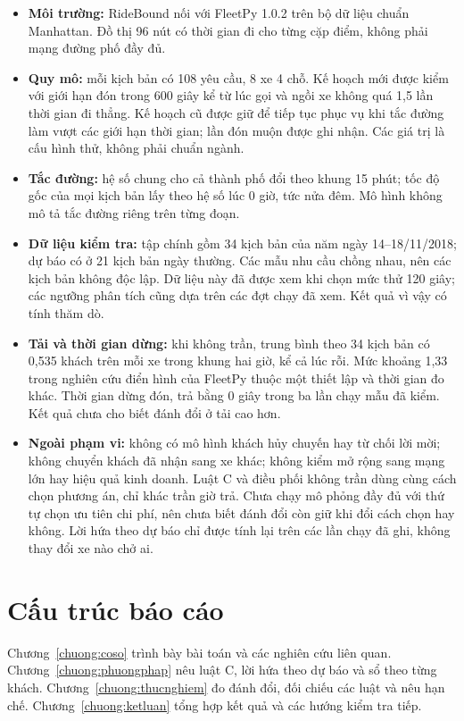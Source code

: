 \begin{itemize}[leftmargin=0.7cm,itemsep=3pt,topsep=3pt]
\item \textbf{Môi trường:} RideBound nối với FleetPy 1.0.2 trên bộ dữ liệu chuẩn Manhattan.
Đồ thị 96 nút có thời gian đi cho từng cặp điểm, không phải mạng đường phố đầy đủ.
\item \textbf{Quy mô:} mỗi kịch bản có 108 yêu cầu, 8 xe 4 chỗ. Kế hoạch mới được kiểm với giới hạn
đón trong 600 giây kể từ lúc gọi và ngồi xe không quá 1,5 lần thời gian đi thẳng. Kế hoạch cũ được
giữ để tiếp tục phục vụ khi tắc đường làm vượt các giới hạn thời gian; lần đón muộn được ghi nhận.
Các giá trị là cấu hình thử, không phải chuẩn ngành.
\item \textbf{Tắc đường:} hệ số chung cho cả thành phố đổi theo khung 15 phút; tốc độ gốc của mọi
kịch bản lấy theo hệ số lúc 0 giờ, tức nửa đêm. Mô hình không mô tả tắc đường riêng trên từng đoạn.
\item \textbf{Dữ liệu kiểm tra:} tập chính gồm 34 kịch bản của năm ngày 14--18/11/2018; dự báo có ở
21 kịch bản ngày thường. Các mẫu nhu cầu chồng nhau, nên các kịch bản không độc lập. Dữ liệu này đã
được xem khi chọn mức thử 120 giây; các ngưỡng phân tích cũng dựa trên các đợt chạy đã xem. Kết quả
vì vậy có tính thăm dò.
\item \textbf{Tải và thời gian dừng:} khi không trần, trung bình theo 34 kịch bản có 0,535 khách
trên mỗi xe trong khung hai giờ, kể cả lúc rỗi. Mức khoảng 1,33 trong nghiên cứu điển hình của
FleetPy thuộc một thiết lập và thời gian đo khác. Thời gian dừng đón, trả bằng 0 giây trong ba
lần chạy mẫu đã kiểm. Kết quả chưa cho biết đánh đổi ở tải cao hơn.
\item \textbf{Ngoài phạm vi:} không có mô hình khách hủy chuyến hay từ chối lời mời; không chuyển
khách đã nhận sang xe khác; không kiểm mở rộng sang mạng lớn hay hiệu quả kinh doanh. Luật C và
điều phối không trần dùng cùng cách chọn phương án, chỉ khác trần giờ trả. Chưa chạy mô phỏng đầy đủ
với thứ tự chọn ưu tiên chi phí, nên chưa biết đánh đổi còn giữ khi đổi cách chọn hay không.
Lời hứa theo dự báo chỉ được tính lại trên các lần chạy đã ghi, không thay đổi xe nào chở ai.
\end{itemize}

\section{Cấu trúc báo cáo}
\label{muc:c1-cautruc}

Chương~\ref{chuong:coso} trình bày bài toán và các nghiên cứu liên quan.
Chương~\ref{chuong:phuongphap} nêu luật C, lời hứa theo dự báo và sổ theo từng khách.
Chương~\ref{chuong:thucnghiem} đo đánh đổi, đối chiếu các luật và nêu hạn chế.
Chương~\ref{chuong:ketluan} tổng hợp kết quả và các hướng kiểm tra tiếp.
